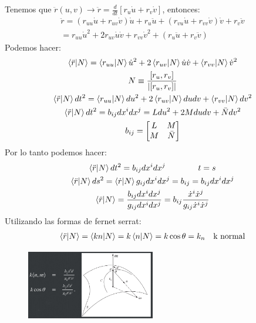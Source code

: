 \documentclass{article}
\begin{document}
Tenemos que $ \ddot r (u,v) \rightarrow \ddot r = \frac{d  }{d t}\left[r _{u } \dot u + r _{v } \dot v \right] $, entonces: 
\begin{gather}
  \ddot r = (r _{uu } \dot u + r _{uv } \dot v )\dot u + r _{u } \ddot u + ( r _{vu } \dot u + r _{vv } \dot v )\dot v + r _{v } \ddot v \\
  = r _{uu} \dot u ^ {2 } + 2 r _{uv } \dot u \dot v + r _{vv } \dot v ^ {2 } + ( r _{u } \ddot u + r _{v } \ddot v )
\end{gather}
Podemos hacer: 
\begin{gather}
  \bra{\ddot r }\ket{N } = \bra{r _{uu } }\ket{N }\dot u ^ {2 } + 2 \bra{r _{uv } }\ket{N }\dot u \dot v + \bra{r _{vv } }\ket{N }\dot v ^ {2 }\\
  N \equiv \frac{[r _{u } , r _{v } ]}{\left|[r _{u } , r _{v } ]\right|}\\
  \bra{\ddot r }\ket{N }dt ^ {2 } = \bra{r _{uu} }\ket{N }du ^ {2 } + 2 \bra{r _{uv } }\ket{N }dudv + \bra{r _{vv } }\ket{N } dv ^ {2 }\\
  \bra{\ddot r }\ket{N }dt ^ {2 } = b _{ij } dx ^ {i }dx ^ {j } = L du ^ {2 } + 2 M dudv + \bar N dv ^ {2 }\\
  b _{ij }  = \begin{bmatrix}
      L & M \\
      M & \bar N 
  \end{bmatrix}  
\end{gather}
Por lo tanto podemos hacer: 
\begin{gather}
  \bra{\ddot r }\ket{N }dt ^ {2 } = b _{ij } dx ^ {i }dx ^ {j } \qquad \qquad t = s \\
  \bra{\ddot r }\ket{N }ds ^ {2 } = \bra{\dot r }\ket{N } g _{ij } dx ^ {i }dx ^ {j } = b _{ij } = b _{ij } dx ^ {i }dx ^ {j }\\
  \bra{\ddot r }\ket{N } = \frac{b _{ij } dx ^ {i }dx ^ {j }}{g _{ij } dx ^ {i }dx ^ {j }} = b _{ij } \frac{\dot x ^ {i }\dot x ^ {j }}{g _{ij } \dot x ^ {i }\dot x ^ {j }} 
\end{gather}
Utilizando las formas de fernet serrat: 
\begin{gather}
  \bra{\ddot r }\ket{N } = \bra{kn }\ket{N } = k \bra{n}\ket{N} = k \cos{\theta} = k _{n } \quad \text{k normal}
\end{gather}
\begin{figure}[H]
  \begin{center}
    \includegraphics[width=0.5\textwidth]{knormal.png}
  \end{center}
\end{figure}
\end{document}
